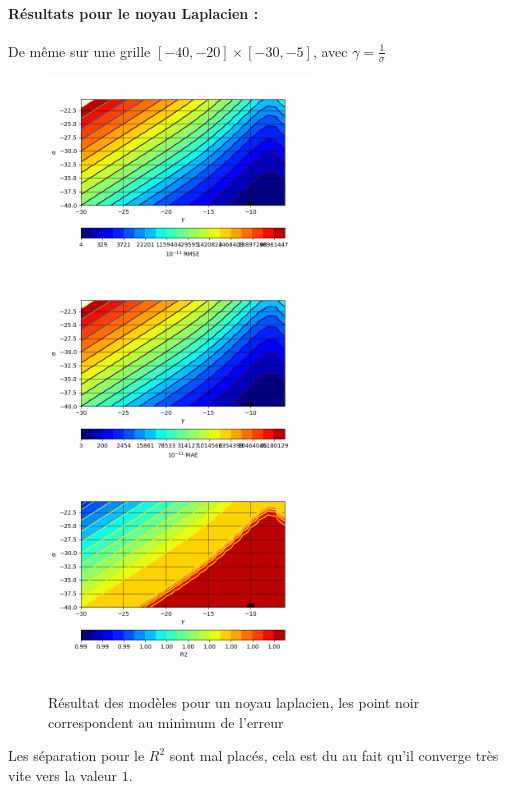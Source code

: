 \documentclass[a4paper,12pt,titlepage]{report}
\begin{document}
\paragraph{Résultats pour le noyau Laplacien : }
De même sur une grille $[-40,-20]\times[-30,-5]$, avec $\gamma = \frac{1}{\sigma}$
	\begin{figure}[!h]	
		\begin{center}
		\includegraphics[height = 5.2cm, keepaspectratio]{graphes/resultat_Lapla_RMSE.png}
		\includegraphics[height = 5.2cm, keepaspectratio]{graphes/resultat_Lapla_MAE.png}
		\includegraphics[height = 5.2cm, keepaspectratio]{graphes/resultat_Lapla_R2.png}
	\caption{Résultat des modèles pour un noyau laplacien, les point noir correspondent au minimum de l'erreur}
		\end{center}
	\end{figure}
Les séparation pour le $R^2$ sont mal placés, cela est du au fait qu'il converge très vite vers la valeur $1$.
\end{document}
